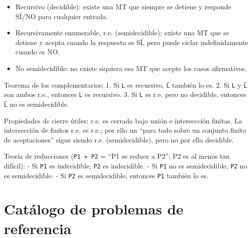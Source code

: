 \documentclass[12pt]{book} %
\providecommand{\tightlist}{%
  \setlength{\itemsep}{0pt}\setlength{\parskip}{0pt}}
\begin{document}
\begin{itemize}
\tightlist
\item
  Recursivo (decidible): existe una MT que siempre se detiene y responde
  SÍ/NO para cualquier entrada.
\item
  Recursivamente enumerable, r.e. (semidecidible): existe una MT que se
  detiene y acepta cuando la respuesta es SÍ, pero puede ciclar
  indefinidamente cuando es NO.
\item
  No semidecidible: no existe siquiera esa MT que acepte los casos
  afirmativos.
\end{itemize}

Teorema de los complementarios: 1. Si \texttt{L} es recursivo,
\texttt{L̄} también lo es. 2. Si \texttt{L} y \texttt{L̄} son ambos r.e.,
entonces \texttt{L} es recursivo. 3. Si \texttt{L} es r.e. pero no
decidible, entonces \texttt{L̄} no es semidecidible.

Propiedades de cierre útiles: r.e. es cerrada bajo unión e intersección
finitas. La intersección de finitos r.e. es r.e.; por ello un ``para
todo sobre un conjunto finito de aceptaciones'' sigue siendo r.e.
(semidecidible), pero no por ello decidible.

Teoría de reducciones (\texttt{P1\ ∝\ P2} = ``P1 se reduce a P2''; P2 es
al menos tan difícil): - Si \texttt{P1} es indecidible, \texttt{P2} es
indecidible. - Si \texttt{P1} no es semidecidible, \texttt{P2} no es
semidecidible. - Si \texttt{P2} es semidecidible, entonces \texttt{P1}
también lo es.

\hypertarget{catuxe1logo-de-problemas-de-referencia}{%
\section{Catálogo de problemas de
referencia}\label{catuxe1logo-de-problemas-de-referencia}}
\end{document}
